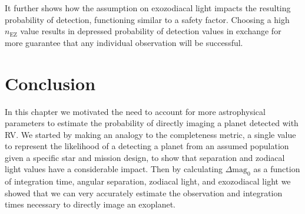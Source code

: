 It further shows how the assumption on exozodiacal light impacts the
resulting probability of detection, functioning similar to a safety factor. Choosing
a high $n_\textrm{EZ}$ value results in depressed probability of detection values
in exchange for more guarantee that any individual observation will be successful.


\section{Conclusion} %
\label{sec:con_ddMag_comp}

In this chapter we motivated the need to account for more astrophysical
parameters to estimate the probability of directly imaging a planet detected
with RV. We started by making an analogy to the completeness metric, a single
value to represent the likelihood of a detecting a planet from an assumed
population given a specific star and mission design, to show that separation
and zodiacal light values have a considerable impact. Then by calculating 
$\Delta\textrm{mag}_0$ as a function of integration time, angular separation,
zodiacal light, and exozodiacal light we showed that we can very
accurately estimate the observation and integration times necessary to
directly image an exoplanet.

